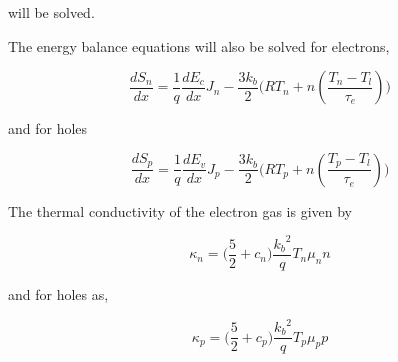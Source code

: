 will be solved.

The energy balance equations will also be solved for electrons,

\begin{equation}
\frac{dS_{n}}{dx}=\frac{1}{q}\frac{dE_{c}}{dx} J_{n}-\frac{3 k_{b}}{2} \Bigg( R T_{n}+ n(\frac{T_{n}-T_{l}}{\tau_{e}}) \Bigg)
\end{equation}

and for holes

\begin{equation}
\frac{dS_{p}}{dx}=\frac{1}{q}\frac{dE_{v}}{dx} J_{p}-\frac{3 k_{b}}{2} \Bigg( R T_{p}+ n(\frac{T_{p}-T_{l}}{\tau_{e}}) \Bigg)
\end{equation}

The thermal conductivity of the electron gas is given by

\begin{equation}
\kappa_{n}=\Bigg ( \frac{5}{2} +c_n\Bigg) \frac{{k_{b}}^2}{q} T_{n} \mu_n n
\end{equation}

and for holes as,

\begin{equation}
\kappa_{p}=\Bigg ( \frac{5}{2} +c_p\Bigg) \frac{{k_{b}}^2}{q} T_{p} \mu_p p
\end{equation}



\newpage

